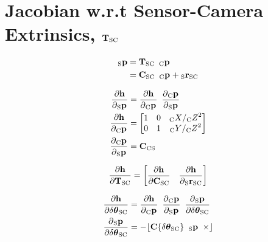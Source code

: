 \section{Jacobian w.r.t Sensor-Camera Extrinsics, $\Tf{\sensor}{\cam}$}

\begin{align}
  \Point{\sensor}{\fiducial_{ij}}
  &=
    \Tf{\sensor}{\cam}
    \enspace \Pt{\cam} \\
  &=
    \Rot{\sensor}{\cam}
    \enspace \Pt{\cam}
		+ \Pos{\sensor}{\cam}
\end{align}

\begin{align}
  \dfrac{\partial{\projFunc}}{\partial{\Pt{\sensor}}}
		&=
			\dfrac{\partial{\projFunc}}{\partial{\Pt{\cam}}}
			\enspace
			\dfrac{\partial{\Pt{\cam}}}{\partial{\Pt{\sensor}}} \\
  \dfrac{\partial{\projFunc}}{\partial{\Pt{\cam}}}
		&=
			\begin{bmatrix}
				1 & 0 & \KineNotationBare{X}{\cam} / \KineNotationBare{Z}{\cam}^{2} \\
				0 & 1 & \KineNotationBare{Y}{\cam} / \KineNotationBare{Z}{\cam}^{2}
			\end{bmatrix} \\
  \dfrac{\partial{\Pt{\cam}}}{\partial{\Pt{\sensor}}}
		&= \Rot{\cam}{\sensor}
\end{align}


\begin{equation}
  \dfrac{\partial{\projFunc}}{\partial{\Tf{\sensor}{\cam}}}
    =
			\begin{bmatrix}
				\dfrac{\partial{\projFunc}}{\partial{\Rot{\sensor}{\cam}}}
				\quad
				\dfrac{\partial{\projFunc}}{\partial{\Pos{\sensor}{\cam}}}
			\end{bmatrix}
\end{equation}


\begin{align}
  \dfrac{\partial{\projFunc}}{\partial{\dtheta_{\sensor\cam}}}
    &=
      \dfrac{\partial{\projFunc}}{\partial{\Pt{\cam}}}
			\enspace
      \dfrac{\partial{\Pt{\cam}}}{\partial{\Pt{\sensor}}}
			\enspace
      \dfrac{\partial{\Pt{\sensor}}}{\partial{\dtheta_{\sensor\cam}}} \\
	\dfrac{\partial{\Pt{\sensor}}}{\partial{\dtheta_{\sensor\cam}}}
    &= -\Skew{\rot\{\dtheta_{\sensor\cam}\} \enspace \Pt{\sensor}}
\end{align}


